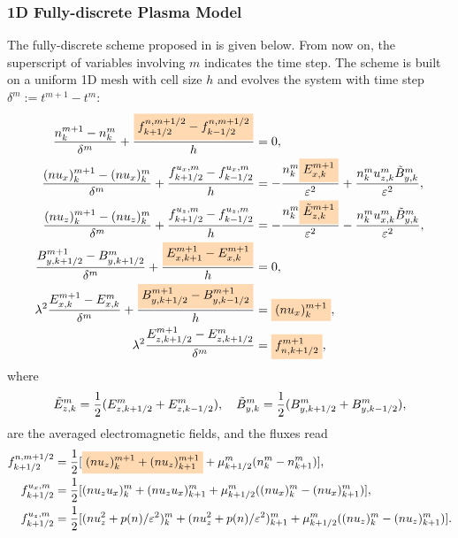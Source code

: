 \documentclass{article}
\newcommand{\mycolorbox}[2]{\colorbox{#1}{$\displaystyle#2$}}
\begin{document}
\subsubsection{1D Fully-discrete Plasma Model} \label{sec:1d_fully_discrete_model}
The fully-discrete scheme proposed in \cite{degond_2012} is given below. From now on, the superscript of variables involving $m$ indicates the time step. The scheme is built on a uniform 1D mesh with cell size $h$ and evolves the system with time step $\delta^m := t^{m+1} - t^m$:  
\begin{align*}
    \frac{n^{m+1}_k - n^m_k}{\delta^m} + \frac{\mycolorbox{orange!30}{f^{n,m+1/2}_{k+1/2} - f^{n,m+1/2}_{k-1/2}}}{h} &= 0, \\
    \frac{(nu_x)^{m+1}_k - (nu_x)^m_k}{\delta^m} + \frac{f^{u_x,m}_{k+1/2} - f^{u_x,m}_{k-1/2}}{h} &= -\frac{n^m_k \mycolorbox{orange!30}{E^{m+1}_{x,k}}}{\varepsilon^2} + \frac{n^m_k u^m_{z,k}\Tilde{B}^m_{y,k}}{\varepsilon^2},\\
    \frac{(nu_z)^{m+1}_k - (nu_z)^m_k}{\delta^m} + \frac{f^{u_z,m}_{k+1/2} - f^{u_z,m}_{k-1/2}}{h} &= - \frac{n^m_k \mycolorbox{orange!30}{\Tilde{E}^{m+1}_{z,k}}}{\varepsilon^2} - \frac{n^m_k u^m_{x,k}\Tilde{B}^m_{y,k}}{\varepsilon^2}, \\ 
    \frac{B^{m+1}_{y,k+1/2} - B^{m}_{y,k+1/2}}{\delta^m} + \frac{\mycolorbox{orange!30}{E^{m+1}_{x,k+1} - E^{m+1}_{x,k}}}{h} &= 0, \\
    \lambda^2 \frac{E^{m+1}_{x,k} - E^{m}_{x,k}}{\delta^m} + \frac{\mycolorbox{orange!30}{B^{m+1}_{y,k+1/2} - B^{m+1}_{y,k-1/2}}}{h} &= \mycolorbox{orange!30}{(nu_x)^{m+1}_k}, \\
    \lambda^2 \frac{E^{m+1}_{z,k+1/2} - E^{m}_{z,k+1/2}}{\delta^m} &= \mycolorbox{orange!30}{f^{m+1}_{n,k+1/2}}, 
\end{align*}
where 
\begin{equation*}
    \Tilde{E}^m_{z,k} = \frac{1}{2}(E^m_{z,k+1/2} + E^m_{z,k-1/2}), \ \ \ \Tilde{B}^m_{y,k} = \frac{1}{2}(B^m_{y,k+1/2} + B^m_{y,k-1/2}),
\end{equation*}
are the averaged electromagnetic fields, and the fluxes read
\begin{align*}
    f^{n,m+1/2}_{k+1/2} & = \frac{1}{2}[\mycolorbox{orange!30}{(nu_z)^{m+1}_k + (nu_z)^{m+1}_{k+1}} + \mu^m_{k+1/2}(n^m_k - n^m_{k+1})], \\
    f^{u_x,m}_{k+1/2} & = \frac{1}{2}[(nu_zu_x)^{m}_k + (nu_zu_x)^{m}_{k+1} + \mu^m_{k+1/2}((nu_x)^m_k - (nu_x)^m_{k+1})], \\
    f^{u_z,m}_{k+1/2} & = \frac{1}{2}[(nu_z^2 + p(n)/\varepsilon^2)^{m}_k + (nu_z^2 + p(n)/\varepsilon^2)^{m}_{k+1} + \mu^m_{k+1/2}((nu_z)^m_k - (nu_z)^m_{k+1})].
\end{align*}
\end{document}
